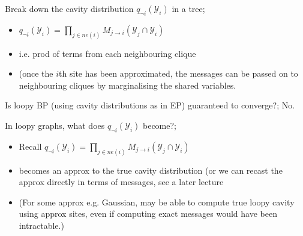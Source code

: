 \documentclass{article}
\begin{document}
Break down the cavity distribution $q_{\neg i}(\mathcal{Y}_i)$ in a tree; \begin{itemize}
    \item $q_{\neg i}(\mathcal{Y}_i) = \prod_{j\in ne(i)}M_{j\rightarrow i}(\mathcal{Y}_j \cap \mathcal{Y}_i)$
    \item i.e. prod of terms from each neighbouring clique
    \item (once the $i$th site has been approximated, the messages can be passed on to neighbouring cliques by marginalising the shared variables.
\end{itemize}

Is loopy BP (using cavity distributions as in EP) guaranteed to converge?; No.

In loopy graphs, what does $q_{\neg i}(\mathcal{Y}_i)$ become?; \begin{itemize}
    \item Recall $q_{\neg i}(\mathcal{Y}_i) = \prod_{j\in ne(i)}M_{j\rightarrow i}(\mathcal{Y}_j \cap \mathcal{Y}_i)$
    \item becomes an approx to the true cavity distribution (or we can recast the approx directly in terms of messages, see a later lecture
    \item (For some approx e.g. Gaussian, may be able to compute true loopy cavity using approx sites, even if computing exact messages would have been intractable.)
\end{itemize}

\end{document}
